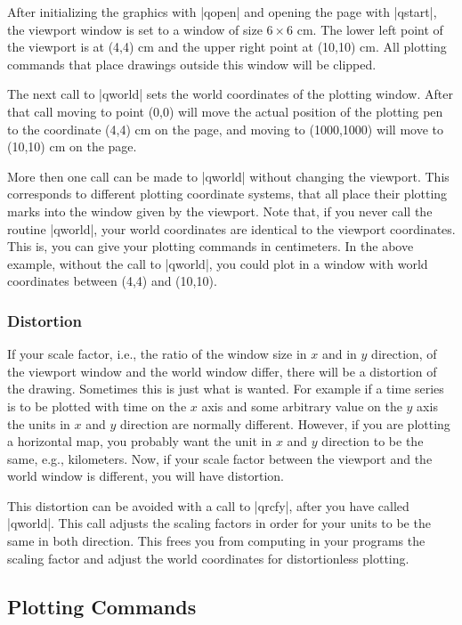 \documentclass{article}
\begin{document}
After initializing the graphics with |qopen| and opening the page with
|qstart|, the viewport window is set to a window of size $6\times6$ cm.
The lower left point of the viewport is at (4,4) cm and the upper right
point at (10,10) cm.  All plotting commands that place drawings outside
this window will be clipped.

The next call to |qworld| sets the world coordinates of the plotting
window.  After that call moving to point (0,0) will move the actual
position of the plotting pen to the coordinate (4,4) cm on the page,
and moving to (1000,1000) will move to (10,10) cm on the page.

More then one call can be made to |qworld| without changing the
viewport.  This corresponds to different plotting coordinate systems,
that all place their plotting marks into the window given by the
viewport.  Note that, if you never call the routine |qworld|, your
world coordinates are identical to the viewport coordinates. This is,
you can give your plotting commands in centimeters. In the above
example, without the call to |qworld|, you could plot in a window with
world coordinates between (4,4) and (10,10).


\subsubsection{Distortion}

If your scale factor, i.e., the ratio of the window size in $x$
and in $y$ direction, of the viewport window and the world window
differ, there will be a distortion of the drawing. Sometimes this is
just what is wanted. For example if a time series is to be plotted with
time on the $x$ axis and some arbitrary value on the $y$ axis the units
in $x$ and $y$ direction are normally different. However, if you are
plotting a horizontal map, you probably want the unit in $x$ and $y$
direction to be the same, e.g., kilometers. Now, if your scale
factor between the viewport and the world window is different, you will
have distortion.

This distortion can be avoided with a call to |qrcfy|, after you have
called |qworld|. This call adjusts the scaling factors in order for
your units to be the same in both direction. This frees you from
computing in your programs the scaling factor and adjust the world
coordinates for distortionless plotting.


\subsection{Plotting Commands}
\end{document}
